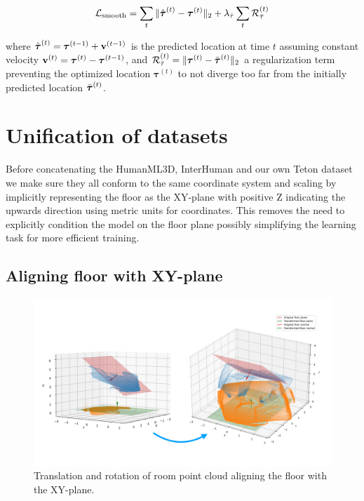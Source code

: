 \begin{equation}
    \mathcal{L}_\text{smooth} = \sum_t{\| \hat{\boldsymbol{\mathbf{\tau}}}^{(t)} - \boldsymbol{\mathbf{\tau}}^{(t)} \|_2} + \lambda_{\hat{\tau}} \sum_t{\mathcal{R}_{\bar{\tau}}^{(t)}}
\end{equation}

where $\hat{\boldsymbol{\mathbf{\tau}}}^{(t)} = \boldsymbol{\mathbf{\tau}}^{(t-1)} + \boldsymbol{\mathbf{v}}^{(t-1)}$ is the predicted location at time $t$ assuming constant velocity $\boldsymbol{\mathbf{v}}^{(t)} = \boldsymbol{\mathbf{\tau}}^{(t)} - \boldsymbol{\mathbf{\tau}}^{(t-1)}$, and $\mathcal{R}_{\bar{\tau}}^{(t)} = \| \boldsymbol{\mathbf{\tau}}^{(t)} - \bar{\boldsymbol{\mathbf{\tau}}}^{(t)} \|_2$ a regularization term preventing the optimized location $\mathbf{\tau}^{(t)}$ to not diverge too far from the initially predicted location $\bar{\boldsymbol{\mathbf{\tau}}}^{(t)}$.





\section{Unification of datasets}
Before concatenating the HumanML3D, InterHuman and our own Teton dataset we make sure they all conform to the same coordinate system and scaling by implicitly representing the floor as the XY-plane with positive Z indicating the upwards direction using metric units for coordinates. This removes the need to explicitly condition the model on the floor plane possibly simplifying the learning task for more efficient training.


\subsection*{Aligning floor with XY-plane}
\begin{figure}[H]
    \centering
    \includegraphics[width=\linewidth]{figures/rotation.pdf}
    \caption{Translation and rotation of room point cloud aligning the floor with the XY-plane.}
    \label{fig:rotate-floor-planes}
\end{figure}

